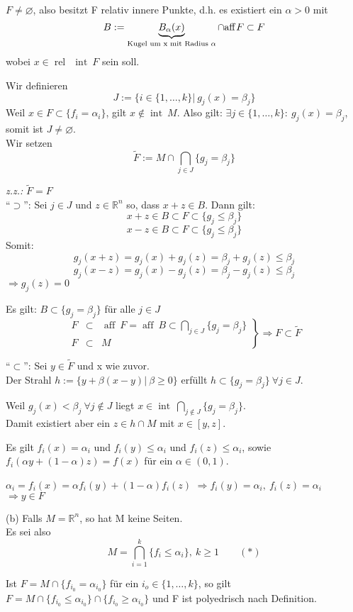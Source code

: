 \documentclass[a4paper,11pt,twoside,titlepage]{article}
\newcommand{\R}{{\mathbb R}}
\newcommand{\aff}{{\operatorname{aff}\:}}
\newcommand{\inter}{{\operatorname{int}\:}}
\newcommand{\rel}{{\operatorname{rel}\:}}
\begin{document}
$F\neq\varnothing$, also besitzt F relativ innere Punkte, d.h. es existiert ein $\alpha>0$ mit \[B:=\underbrace{B_\alpha(x)}_{\textnormal{Kugel um x mit Radius \ensuremath{\alpha}}}\cap \aff\!F\subset F\] wobei $x\in \rel\:\inter F$ sein soll.

Wir definieren \[J:=\{i\in\{1,\ldots,k\}|\:g_j(x)=\beta_j\}\]
Weil $x\in F\subset\{f_i=\alpha_i\}$, gilt $x\not\in \inter M$. Also gilt: $\exists j\in\{1,\ldots,k\}:\ g_j(x)=\beta_j$, somit ist $J\neq\varnothing$.\\
Wir setzen \[\tilde F:=M\cap\bigcap_{j\in J}\{g_j=\beta_j\}\]

\textit{z.z.:} $\tilde F=F$\\
"`$\supset$"': Sei $j\in J$ und $z\in\R^n$ so, dass $x+z\in B$. Dann gilt:
\[x+z\in B\subset F\subset \{g_j\leq\beta_j\}\]
\[x-z\in B\subset F\subset \{g_j\leq\beta_j\}\]
Somit:
\[g_j(x+z)=g_j(x)+g_j(z)=\beta_j+g_j(z)\leq\beta_j\]
\[g_j(x-z)=g_j(x)-g_j(z)=\beta_j-g_j(z)\leq\beta_j\]
$\Rightarrow g_j(z)=0$

Es gilt: $B\subset\{g_j=\beta_j\}$ für alle $j\in J$
\[\left.\begin{array}{rcl}F&\subset&\aff F=\aff B\subset\bigcap_{j\in J}\{g_j=\beta_j\}\\F&\subset&M\end{array}\right\}\Rightarrow F\subset \tilde F\]

"`$\subset$"': Sei $y\in\tilde F$ und x wie zuvor.\\
Der Strahl $h:=\{y+\beta(x-y)|\:\beta\geq0\}$ erfüllt $h\subset\{g_j=\beta_j\}\ \forall j\in J$.

Weil $g_j(x)<\beta_j\ \forall j\not\in J$ liegt $x\in \inter\bigcap_{j\not\in J}\{g_j=\beta_j\}$.\\
Damit existiert aber ein $z\in h\cap M$ mit $x\in[y,z]$.

Es gilt $f_i(x)=\alpha_i$ und $f_i(y)\leq\alpha_i$ und $f_i(z)\leq\alpha_i$, sowie $f_i(\alpha y+(1-\alpha)z)=f(x)$ für ein $\alpha\in(0,1)$.

$\alpha_i=f_i(x)=\alpha f_i(y)+(1-\alpha)f_i(z)$ $\Rightarrow f_i(y)=\alpha_i,\:f_i(z)=\alpha_i$ $\Rightarrow y\in F$

(b) Falls $M=\R^n$, so hat M keine Seiten.\\
Es sei also \[M=\bigcap_{i=1}^k\{f_i\leq\alpha_i\},\ k\geq1\qquad(\ast)\]

Ist $F=M\cap\{f_{i_0}=\alpha_{i_0}\}$ für ein $i_o\in\{1,\ldots,k\}$, so gilt $F=M\cap\{f_{i_0}\leq\alpha_{i_0}\}\cap\{f_{i_0}\geq\alpha_{i_0}\}$ und F ist polyedrisch nach Definition.
\end{document}
